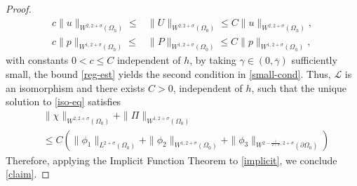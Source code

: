 \documentclass[11pt,a4paper]{amsart}
\theoremstyle{remark}
\theoremstyle{definition}
\numberwithin{equation}{section}
\numberwithin{proposition}{section}
\begin{document}
\begin{proof}
\begin{equation}
\begin{aligned}
 c\|u\|_{W^{2, 2+\sigma}(\Omega_h)}\leq &\|U\|_{W^{2, 2+\sigma}(\Omega_0)}\leq C\|u\|_{W^{2, 2+\sigma}(\Omega_h)},\\[5pt] c\|p\|_{W^{1, 2+\sigma}(\Omega_h)}\leq &\|P\|_{W^{1, 2+\sigma}(\Omega_0)}\leq C\|p\|_{W^{1, 2+\sigma}(\Omega_h)},
 \end{aligned}
\end{equation} with constants $0<c\leq C$ independent of $h$, by taking $\gamma \in (0,\overline{\gamma})$ sufficiently small, the bound \eqref{reg-est}
yields the second condition in \eqref{small-cond}. Thus, $\mathcal{L}$ is an isomorphism and there exists $C>0$, independent of $h$, such that the unique solution to \eqref{iso-eq} satisfies
\begin{equation}\label{est-iso}\begin{aligned}
    &\|\chi\|_{W^{2, 2+\sigma}(\Omega_0)} + \|\Pi\|_{W^{1, 2+\sigma}(\Omega_0)} \\[5pt]&\leq C \left( \|\phi_1\|_{L^{2+\sigma}(\Omega_0)} + \|\phi_2\|_{W^{1, 2+\sigma}(\Omega_0)} + \|\phi_3\|_{W^{2-\frac{1}{2+\sigma}, 2+\sigma}(\partial \Omega_0)}\right)\end{aligned}
\end{equation}
Therefore,  applying the Implicit Function Theorem to \eqref{implicit}, we conclude \eqref{claim}.


\end{proof}
\end{document}
